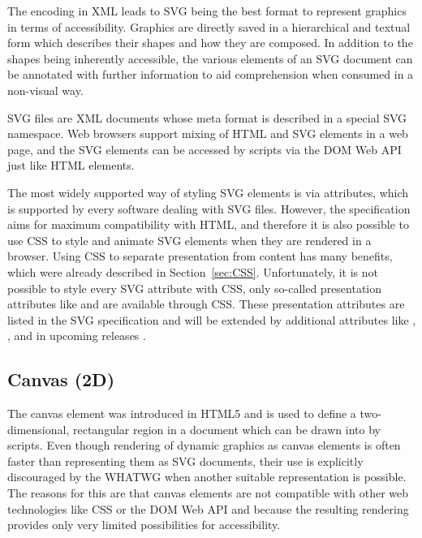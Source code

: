 The encoding in XML leads to SVG being the best format to represent
graphics in terms of accessibility. Graphics are directly saved in a
hierarchical and textual form which describes their shapes and how
they are composed. In addition to the shapes being inherently
accessible, the various elements of an SVG document can be annotated
with further information to aid comprehension when consumed in a
non-visual way.

SVG files are XML documents whose meta format is described in a
special SVG namespace. Web browsers support mixing of HTML and SVG
elements in a web page, and the SVG elements can be accessed by
scripts via the DOM Web API just like HTML elements.

The most widely supported way of styling SVG elements is via
attributes, which is supported by every software dealing with SVG
files. However, the specification aims for maximum compatibility with
HTML, and therefore it is also possible to use CSS to style and
animate SVG elements when they are rendered in a browser. Using CSS to
separate presentation from content has many benefits, which were
already described in Section~\ref{sec:CSS}. Unfortunately, it is not
possible to style every SVG attribute with CSS, only so-called
presentation attributes like  and 
are available through CSS. These presentation attributes are listed in
the SVG specification \parencite{SVG11} and will be extended by
additional attributes like , , 
and  in upcoming releases \parencite{SVG2}.





\subsection{Canvas (2D)}
\label{sec:Canvas2D}

The canvas element was introduced in HTML5 \parencite{HTML} and is
used to define a two-dimensional, rectangular region in a document
which can be drawn into by scripts. Even though rendering of dynamic
graphics as canvas elements is often faster than representing them as
SVG documents, their use is explicitly discouraged by the WHATWG when
another suitable representation is possible. The reasons for this are
that canvas elements are not compatible with other web technologies
like CSS or the DOM Web API and because the resulting rendering
provides only very limited possibilities for accessibility.

